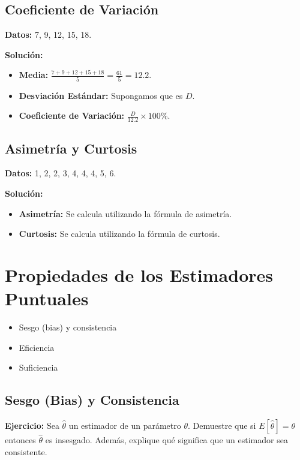 \documentclass{article}
\begin{document}
\subsection{Coeficiente de Variación}

\textbf{Datos:} 7, 9, 12, 15, 18.

\textbf{Solución:}

\begin{itemize}
    \item \textbf{Media:} $\frac{7 + 9 + 12 + 15 + 18}{5} = \frac{61}{5} = 12.2$.
    \item \textbf{Desviación Estándar:} Supongamos que es $D$.
    \item \textbf{Coeficiente de Variación:} $\frac{D}{12.2} \times 100\%$.
\end{itemize}

\subsection{Asimetría y Curtosis}

\textbf{Datos:} 1, 2, 2, 3, 4, 4, 4, 5, 6.

\textbf{Solución:}

\begin{itemize}
    \item \textbf{Asimetría:} Se calcula utilizando la fórmula de asimetría.
    \item \textbf{Curtosis:} Se calcula utilizando la fórmula de curtosis.
\end{itemize}

\section{Propiedades de los Estimadores Puntuales}
\begin{itemize}
    \item Sesgo (bias) y consistencia
    \item Eficiencia
    \item Suficiencia
\end{itemize}

\subsection{Sesgo (Bias) y Consistencia}

\textbf{Ejercicio:} Sea $\hat{\theta}$ un estimador de un parámetro $\theta$. Demuestre que si $E[\hat{\theta}] = \theta$ entonces $\hat{\theta}$ es insesgado. Además, explique qué significa que un estimador sea consistente.
\end{document}
